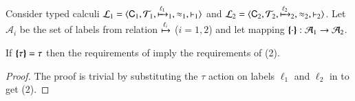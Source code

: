 \begin{proposition}
	Consider typed calculi
	$\mathcal{L}_1 = \langle \mathsf{C}_1, {\cal{T}}_1, \xmapsto{\ell_1}_1, \approx_1, \vdash_1 \rangle$
	and $\mathcal{L}_2=\langle \mathsf{C}_2, {\cal{T}}_2, \xmapsto{\ell_2}_2, \approx_2, \vdash_2 \rangle$.
	Let $\mathcal{A}_i$ be the set of labels from relation $\xmapsto{\ell_i}$
	($i=1,2$) and let mapping $\{\!\!\{\cdot\}\!\!\} : \mathcal{A}_1 \to \mathcal{A}_2$.

	If $\{\!\!\{\tau\}\!\!\} = \tau$ then
	the requirements of  imply
	the requirements of (2).
\end{proposition}

\begin{proof}
	The proof is trivial by substituting the $\tau$ action
	on labels $\ell_1$ and $\ell_2$ in 
	to get (2).
\end{proof}

